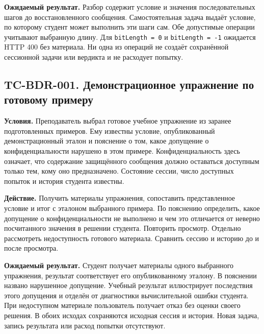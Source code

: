\documentclass[12pt,a4paper]{article}
\begin{document}
\textbf{Ожидаемый результат.} Разбор содержит условие и значения последовательных шагов до восстановленного сообщения. Самостоятельная задача выдаёт условие, по которому студент может выполнить эти шаги сам. Обе допустимые операции учитывают выбранную длину. Для \texttt{bit\allowbreak{}Length =\allowbreak{} 0} и \texttt{bit\allowbreak{}Length =\allowbreak{} -\allowbreak{}1} ожидается HTTP 400 без материала. Ни одна из операций не создаёт сохранённой сессионной задачи или вердикта и не расходует попытку.

\subsection{TC-BDR-001. Демонстрационное упражнение по готовому примеру}\label{tc-bdr-001-ux434ux435ux43cux43eux43dux441ux442ux440ux430ux446ux438ux43eux43dux43dux43eux435-ux443ux43fux440ux430ux436ux43dux435ux43dux438ux435-ux43fux43e-ux433ux43eux442ux43eux432ux43eux43cux443-ux43fux440ux438ux43cux435ux440ux443}

\hypertarget{tc-bdr-001-демонстрационное-упражнение-по-готовому-примеру}{}

\hypertarget{tc-bdr-001}{}

\textbf{Условия.} Преподаватель выбрал готовое учебное упражнение из заранее подготовленных примеров. Ему известны условие, опубликованный демонстрационный эталон и пояснение о том, какое допущение о конфиденциальности нарушено в этом примере. Конфиденциальность здесь означает, что содержание защищённого сообщения должно оставаться доступным только тем, кому оно предназначено. Состояние сессии, число доступных попыток и история студента известны.

\textbf{Действие.} Получить материалы упражнения, сопоставить представленное условие и итог с эталоном выбранного примера. По пояснению определить, какое допущение о конфиденциальности не выполнено и чем это отличается от неверно посчитанного значения в решении студента. Повторить просмотр. Отдельно рассмотреть недоступность готового материала. Сравнить сессию и историю до и после просмотра.

\textbf{Ожидаемый результат.} Студент получает материалы одного выбранного упражнения, результат соответствует его опубликованному эталону. В пояснении названо нарушенное допущение. Учебный результат иллюстрирует последствия этого допущения и отделён от диагностики вычислительной ошибки студента. При недоступном материале пользователь получает отказ без оценки своего решения. В обоих исходах сохраняются исходная сессия и история. Новая задача, запись результата или расход попытки отсутствуют.
\end{document}
